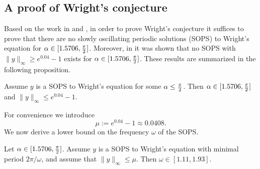 
\subsection{A proof of Wright's conjecture} 


Based on the work in \cite{neumaier2014global} and \cite{wright1955non}, in order to prove Wright's conjecture it suffices to prove that there are no slowly oscillating periodic solutions (SOPS) to Wright's equation for $ \alpha \in [1.5706,\tfrac{\pi}{2}]$. Moreover, in \cite{neumaier2014global} it was shown that no SOPS with $\| y \|_\infty \geq e^{0.04}-1$ exists for  $\alpha \in [1.5706,\tfrac{\pi}{2}]$. These results are summarized in the following proposition.

\begin{proposition}
\label{prop:neumaier}
Assume $y$ is a SOPS to Wright's equation for some $\alpha \leq \tfrac{\pi}{2}$. Then $\alpha \in [1.5706,\tfrac{\pi}{2}]$
and $\| y \|_\infty \leq e^{0.04}-1$. 
\end{proposition}
For convenience we introduce
\[
  \mu := e^{0.04}-1 \approx 0.0408.
\]
We now derive a lower bound on the frequency $\omega$ of the SOPS.
\begin{lemma}\label{lem:omegalarge}
Let $\alpha \in [1.5706,\tfrac{\pi}{2}]$.
Assume $y$ is a SOPS to Wright's equation with minimal period $2\pi/\omega$,
and assume that $\| y \|_\infty \leq \mu$.
Then $\omega \in [1.11,1.93]$.
\end{lemma}

